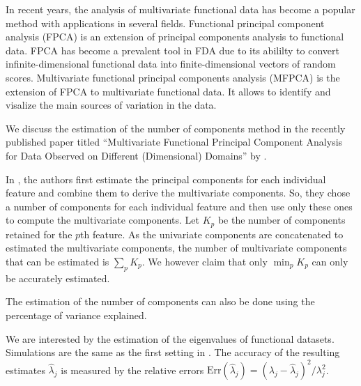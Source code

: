 
In recent years, the analysis of multivariate functional data has become a popular method with applications in several fields. Functional principal component analysis (FPCA) is an extension of principal components analysis to functional data. FPCA has become a prevalent tool in FDA due to its abililty to convert infinite-dimensional functional data into finite-dimensional vectors of random scores. Multivariate functional principal components analysis (MFPCA) is the extension of FPCA to multivariate functional data. It allows to identify and visalize the main sources of variation in the data. 

We discuss the estimation of the number of components method in the recently published paper titled ``Multivariate Functional Principal Component Analysis for Data Observed on Different (Dimensional) Domains'' by \cite{happMultivariateFunctionalPrincipal2018a}.

In \cite{happMultivariateFunctionalPrincipal2018a}, the authors first estimate the principal components for each individual feature and combine them to derive the multivariate components. So, they chose a number of components for each individual feature and then use only these ones to compute the multivariate components. Let $K_p$ be the number of components retained for the $p$th feature. As the univariate components are concatenated to estimated the multivariate components, the number of multivariate components that can be estimated is $\sum_p K_p$. We however claim that only $\min_p K_p$ can only be accurately estimated.

The estimation of the number of components can also be done using the percentage of variance explained. 

We are interested by the estimation of the eigenvalues of functional datasets. Simulations are the same as the first setting in \cite{happMultivariateFunctionalPrincipal2018a}. The accuracy of the resulting estimates $\widehat{\lambda}_j$ is measured by the relative errors $\text{Err}(\widehat{\lambda}_j)  = (\lambda_j - \widehat{\lambda}_j)^2 / \lambda^2_j$.


